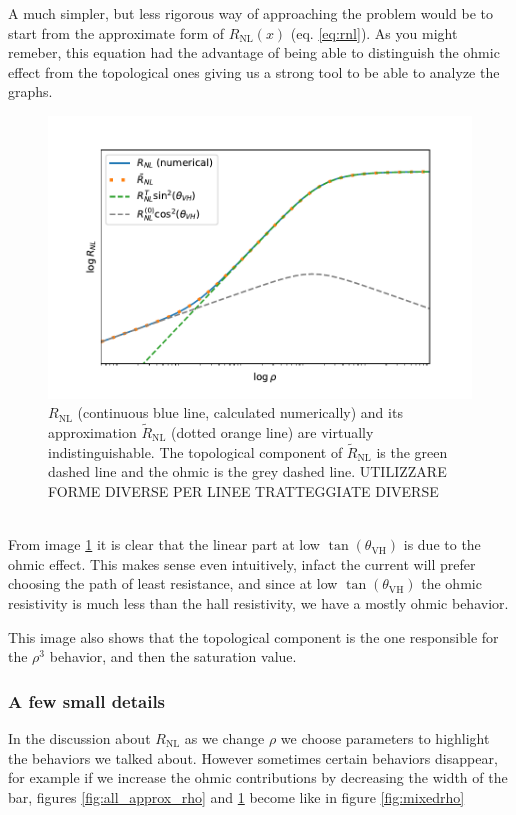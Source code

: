 A much simpler, but less rigorous way of approaching the problem would be to start from the approximate form of $R_{\textrm{NL}}(x)$ (eq. \ref{eq:rnl}). As you might remeber, this equation had the advantage of being able to distinguish the ohmic effect from the topological ones giving us a strong tool to be able to analyze the graphs.
\begin{figure}[h!]
    \centering
    \includegraphics[width=\linewidth]{Immagini/rnl/two_approx_rho.pdf}
    \caption{$R_{\textrm{NL}}$ (continuous blue line, calculated numerically) and its approximation $\tilde R_{\textrm{NL}}$ (dotted orange line) are virtually indistinguishable. The topological component of $\tilde R_{\textrm{NL}}$ is the green dashed line and the ohmic is the grey dashed line. UTILIZZARE FORME DIVERSE PER LINEE TRATTEGGIATE DIVERSE}
    \label{fig:two_approx_rho}
\end{figure}\\

From image \ref{fig:two_approx_rho} it is clear that the linear part at low $\tan(\theta_{\textrm{VH}})$ is due to the ohmic effect. This makes sense even intuitively, infact the current will prefer choosing the path of least resistance, and since at low $\tan(\theta_{\textrm{VH}})$ the ohmic resistivity is much less than the hall resistivity, we have a mostly ohmic behavior.

This image also shows that the topological component is the one responsible for the $\rho^3$ behavior, and then the saturation value.

\subsubsection*{A few small details}
In the discussion about $R_{\textrm{NL}}$ as we change $\rho$ we choose parameters to highlight the behaviors we talked about. However sometimes certain behaviors disappear, for example if we increase the ohmic contributions by decreasing the width of the bar, figures \ref{fig:all_approx_rho} and \ref{fig:two_approx_rho} become like in figure \ref{fig:mixedrho}

